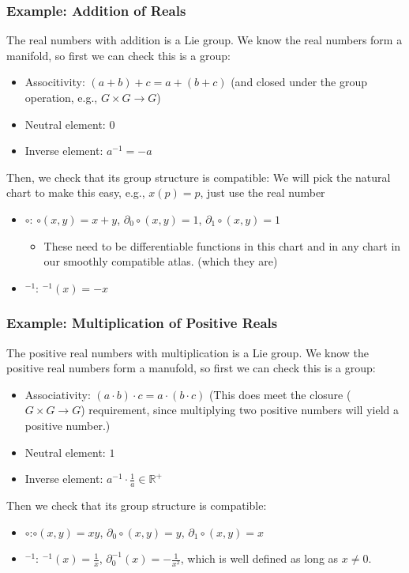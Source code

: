 \documentclass[10pt]{article}
\newcommand{\R}{\mathbb{R}}
\begin{document}
\subsubsection*{Example: Addition of Reals}
The real numbers with addition is a Lie group.  We know the real numbers form a manifold, so first we can check this is a group:
\begin{itemize}
    \item Associtivity: $(a + b) + c = a + (b + c)$   (and closed under the group operation, e.g., $G \times G \rightarrow G$)
    \item Neutral element: $0$
    \item Inverse element: $a^{-1} = -a$ 
\end{itemize}
Then, we check that its group structure is compatible:  We will pick the natural chart to make this easy, e.g., $x(p) = p$, just use the real number
\begin{itemize}
    \item $\circ$: $\circ (x, y) = x + y$, $\partial_0 \circ(x, y) = 1$, $\partial_1 \circ(x, y) = 1$ 
    \begin{itemize}
        \item These need to be differentiable functions in this chart and in any chart in our smoothly compatible atlas. (which they are)
    \end{itemize}
    \item $^{-1}$: $^{-1}(x) = -x$
\end{itemize}

\subsubsection*{Example: Multiplication of Positive Reals}
The positive real numbers with multiplication is a Lie group.  We know the positive real numbers form a manufold, so first we can check this is a group:
\begin{itemize}
    \item Associativity: $(a \cdot b) \cdot c = a \cdot (b \cdot c)$  (This does meet the closure ($G \times G \rightarrow G$) requirement, since multiplying two positive numbers will yield a positive number.)
    \item Neutral element: $1$
    \item Inverse element: $a^{-1} \cdot \frac{1}{a} \in \R^+$
\end{itemize}
Then we check that its group structure is compatible:
\begin{itemize}
    \item $\circ$:$\circ(x, y) = xy$, $\partial_0 \circ(x, y) = y$, $\partial_1 \circ(x, y) = x$
    \item $^{-1}$: $^{-1}(x) = \frac{1}{x}$, $\partial_0^{-1} (x) = -\frac{1}{x^2}$, which is well defined as long as $x \neq 0$.
\end{itemize}
\end{document}
